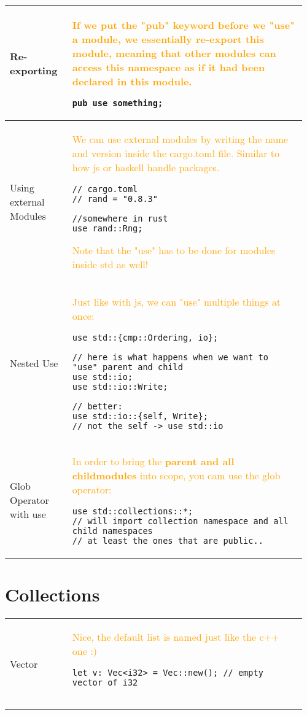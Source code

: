 \documentclass[main.tex,fontsize=8pt,paper=a4,paper=portrait,DIV=calc,]{scrartcl}
\begin{document}
\begin{table}[ht!]
\begin{tabular}{|m{0.2\linewidth}|m{0.755\linewidth}|}
\hline
Re-exporting &
\textcolor{orange}{If we put the "pub" keyword before we "use" a module, we essentially re-export this module, meaning that other modules can access this namespace as if it had been declared in this module.}\newline
\begin{lstlisting}
pub use something;
\end{lstlisting}\\
\hline
Using external Modules & 
\textcolor{orange}{We can use external modules by writing the name and version inside the cargo.toml file.\newline
Similar to how js or haskell handle packages.}\newline
\begin{lstlisting}
// cargo.toml
// rand = "0.8.3"

//somewhere in rust
use rand::Rng;
\end{lstlisting}
\textcolor{orange}{Note that the "use" has to be done for modules inside std as well!}
\\
\hline
Nested Use & 
\textcolor{orange}{Just like with js, we can "use" multiple things at once:}\newline
\begin{lstlisting}
use std::{cmp::Ordering, io};

// here is what happens when we want to "use" parent and child
use std::io;
use std::io::Write;

// better:
use std::io::{self, Write};
// not the self -> use std::io
\end{lstlisting}\\
\hline
Glob Operator with use & 
\textcolor{orange}{In order to bring the \textbf{parent and all childmodules} into scope, you cam use the glob operator:}\newline
\begin{lstlisting}
use std::collections::*;
// will import collection namespace and all child namespaces
// at least the ones that are public..
\end{lstlisting}\\
\hline
\end{tabular}
\section{Collections}
\begin{tabular}{|m{0.2\linewidth}|m{0.755\linewidth}|}
\hline
Vector & 
\textcolor{orange}{Nice, the default list is named just like the c++ one :)}\newline
\begin{lstlisting}
let v: Vec<i32> = Vec::new(); // empty vector of i32


\end{lstlisting}
\end{tabular}
\end{table}
\end{document}
